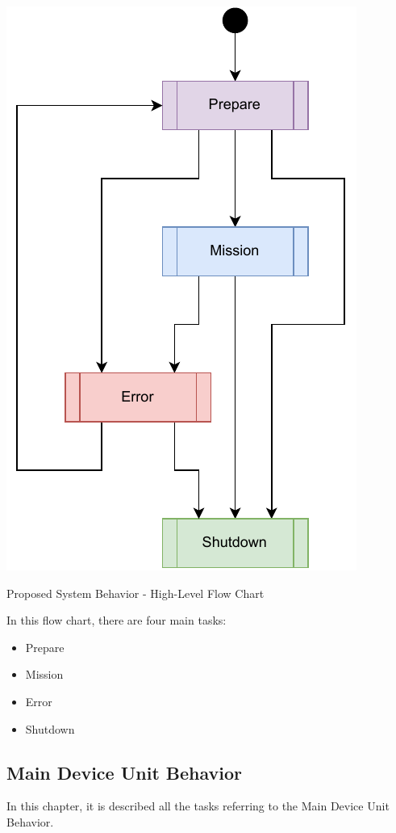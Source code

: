 \begin{algorithm}[H]
    \centering
    \includegraphics[scale=0.8]{ch4/assets/MDU_MAIN.pdf}
    \caption{Proposed System Behavior - High-Level Flow Chart}
    \label{alg:MDU_MAIN}
\end{algorithm}

In this flow chart, there are four main tasks:
\begin{itemize}
    \item Prepare
    \item Mission
    \item Error
    \item Shutdown
\end{itemize}

\subsection{Main Device Unit Behavior}
In this chapter, it is described all the tasks referring to the Main Device Unit Behavior.
